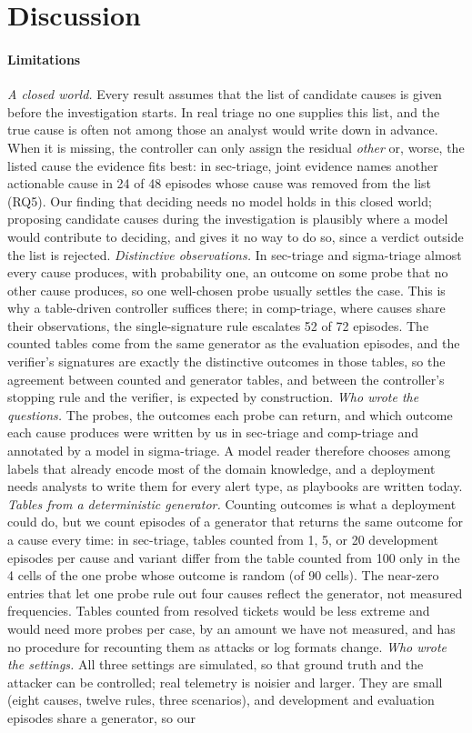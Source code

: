 \section{Discussion}
\label{sec:discussion}

\paragraph{Limitations} \emph{A closed world.} Every result assumes that the list of candidate causes is given before the investigation starts. In real triage no one supplies this list, and the true cause is often not among those an analyst would write down in advance. When it is missing, the controller can only assign the residual \textit{other} or, worse, the listed cause the evidence fits best: in sec-triage, joint evidence names another actionable cause in 24 of 48 episodes whose cause was removed from the list (RQ5). Our finding that deciding needs no model holds in this closed world; proposing candidate causes during the investigation is plausibly where a model would contribute to deciding, and \hesp{} gives it no way to do so, since a verdict outside the list is rejected. \emph{Distinctive observations.} In sec-triage and sigma-triage almost every cause produces, with probability one, an outcome on some probe that no other cause produces, so one well-chosen probe usually settles the case. This is why a table-driven controller suffices there; in comp-triage, where causes share their observations, the single-signature rule escalates 52 of 72 episodes. The counted tables come from the same generator as the evaluation episodes, and the verifier's signatures are exactly the distinctive outcomes in those tables, so the agreement between counted and generator tables, and between the controller's stopping rule and the verifier, is expected by construction. \emph{Who wrote the questions.} The probes, the outcomes each probe can return, and which outcome each cause produces were written by us in sec-triage and comp-triage and annotated by a model in sigma-triage. A model reader therefore chooses among labels that already encode most of the domain knowledge, and a deployment needs analysts to write them for every alert type, as playbooks are written today. \emph{Tables from a deterministic generator.} Counting outcomes is what a deployment could do, but we count episodes of a generator that returns the same outcome for a cause every time: in sec-triage, tables counted from 1, 5, or 20 development episodes per cause and variant differ from the table counted from 100 only in the 4 cells of the one probe whose outcome is random (of 90 cells). The near-zero entries that let one probe rule out four causes reflect the generator, not measured frequencies. Tables counted from resolved tickets would be less extreme and would need more probes per case, by an amount we have not measured, and \hesp{} has no procedure for recounting them as attacks or log formats change. \emph{Who wrote the settings.} All three settings are simulated, so that ground truth and the attacker can be controlled; real telemetry is noisier and larger. They are small (eight causes, twelve rules, three scenarios), and development and evaluation episodes share a generator, so our 